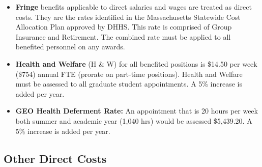 \begin{itemize}

\item \textbf{Fringe} benefits applicable to direct salaries and wages
  are treated as direct costs. They are the rates identified in the
  Massachusetts Statewide Cost Allocation Plan approved by DHHS. This
  rate is comprised of Group Insurance and Retirement. The combined
  rate must be applied to all benefited personnel on any awards.

\item \textbf{Health and Welfare} (H \& W) for all benefited positions
  is \$14.50 per week (\$754) annual FTE (prorate on part-time
  positions).  Health and Welfare must be assessed to all graduate
  student appointments.  A 5\% increase is added per year.


\item \textbf{GEO Health Deferment Rate:} An appointment that is 20
  hours per week both summer and academic year (1,040 hrs) would be
  assessed \$5,439.20.  A 5\% increase is added per year.

\end{itemize}

\subsection*{Other Direct Costs}

